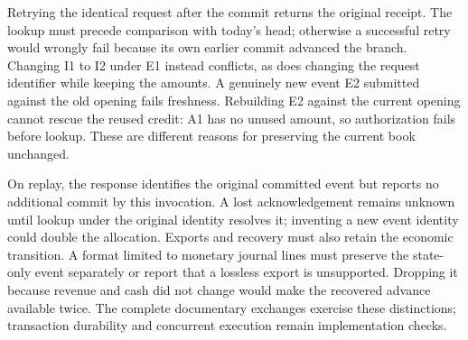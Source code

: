 Retrying the identical request after the commit returns the original receipt.
The lookup must precede comparison with today's head; otherwise a successful
retry would wrongly fail because its own earlier commit advanced the branch.
Changing I1 to I2 under E1 instead conflicts, as does changing the request
identifier while keeping the amounts. A genuinely new event E2 submitted
against the old opening fails freshness. Rebuilding E2 against the current
opening cannot rescue the reused credit: A1 has no unused amount, so
authorization fails before lookup. These are different reasons for preserving
the current book unchanged.

On replay, the response identifies the original committed event but reports
no additional commit by this invocation. A lost acknowledgement remains
unknown until lookup under the original identity resolves it; inventing a new
event identity could double the allocation. Exports and recovery must also
retain the economic transition. A format limited to monetary journal lines
must preserve the state-only event separately or report that a lossless export
is unsupported. Dropping it because revenue and cash did not change would
make the recovered advance available twice. The complete documentary exchanges
exercise these distinctions; transaction durability and concurrent execution
remain implementation checks.
